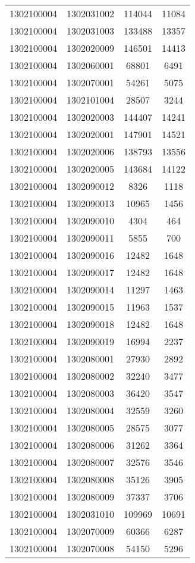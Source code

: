 \begin{longtable}{llcc}
1302100004 & 1302031002 & 114044 & 11084\\
1302100004 & 1302031003 & 133488 & 13357\\
1302100004 & 1302020009 & 146501 & 14413\\
1302100004 & 1302060001 & 68801 & 6491\\
1302100004 & 1302070001 & 54261 & 5075\\
1302100004 & 1302101004 & 28507 & 3244\\
1302100004 & 1302020003 & 144407 & 14241\\
1302100004 & 1302020001 & 147901 & 14521\\
1302100004 & 1302020006 & 138793 & 13556\\
1302100004 & 1302020005 & 143684 & 14122\\
1302100004 & 1302090012 & 8326 & 1118\\
1302100004 & 1302090013 & 10965 & 1456\\
1302100004 & 1302090010 & 4304 & 464\\
1302100004 & 1302090011 & 5855 & 700\\
1302100004 & 1302090016 & 12482 & 1648\\
1302100004 & 1302090017 & 12482 & 1648\\
1302100004 & 1302090014 & 11297 & 1463\\
1302100004 & 1302090015 & 11963 & 1537\\
1302100004 & 1302090018 & 12482 & 1648\\
1302100004 & 1302090019 & 16994 & 2237\\
1302100004 & 1302080001 & 27930 & 2892\\
1302100004 & 1302080002 & 32240 & 3477\\
1302100004 & 1302080003 & 36420 & 3547\\
1302100004 & 1302080004 & 32559 & 3260\\
1302100004 & 1302080005 & 28575 & 3077\\
1302100004 & 1302080006 & 31262 & 3364\\
1302100004 & 1302080007 & 32576 & 3546\\
1302100004 & 1302080008 & 35126 & 3905\\
1302100004 & 1302080009 & 37337 & 3706\\
1302100004 & 1302031010 & 109969 & 10691\\
1302100004 & 1302070009 & 60366 & 6287\\
1302100004 & 1302070008 & 54150 & 5296\\

\end{longtable}
